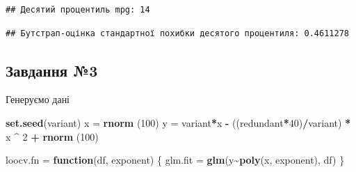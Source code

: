 \documentclass[
]{article}
\newenvironment{Shaded}{\begin{snugshade}}{\end{snugshade}}
\newcommand{\ControlFlowTok}[1]{\textcolor[rgb]{0.13,0.29,0.53}{\textbf{#1}}}
\newcommand{\DecValTok}[1]{\textcolor[rgb]{0.00,0.00,0.81}{#1}}
\newcommand{\FunctionTok}[1]{\textcolor[rgb]{0.13,0.29,0.53}{\textbf{#1}}}
\newcommand{\NormalTok}[1]{#1}
\newcommand{\OtherTok}[1]{\textcolor[rgb]{0.56,0.35,0.01}{#1}}
\newcommand{\SpecialCharTok}[1]{\textcolor[rgb]{0.81,0.36,0.00}{\textbf{#1}}}
\newcommand{\StringTok}[1]{\textcolor[rgb]{0.31,0.60,0.02}{#1}}
\begin{document}
\begin{verbatim}
## Десятий процентиль mpg: 14
\end{verbatim}

\begin{Shaded}
\end{Shaded}

\begin{verbatim}
## Бутстрап-оцінка стандартної похибки десятого процентиля: 0.4611278
\end{verbatim}

\subsection{Завдання
№3}\label{ux437ux430ux432ux434ux430ux43dux43dux44f-3}

Генеруємо дані

\begin{Shaded}
\begin{Highlighting}[]
\FunctionTok{set.seed}\NormalTok{(variant)}
\NormalTok{x }\OtherTok{=} \FunctionTok{rnorm}\NormalTok{ (}\DecValTok{100}\NormalTok{)}
\NormalTok{y }\OtherTok{=}\NormalTok{ variant}\SpecialCharTok{*}\NormalTok{x }\SpecialCharTok{{-}}\NormalTok{ ((redundant}\SpecialCharTok{*}\DecValTok{40}\NormalTok{)}\SpecialCharTok{/}\NormalTok{variant) }\SpecialCharTok{*}\NormalTok{ x }\SpecialCharTok{\^{}} \DecValTok{2} \SpecialCharTok{+} \FunctionTok{rnorm}\NormalTok{ (}\DecValTok{100}\NormalTok{)}
\end{Highlighting}
\end{Shaded}

\begin{Shaded}
\begin{Highlighting}[]
\NormalTok{loocv.fn }\OtherTok{=} \ControlFlowTok{function}\NormalTok{(df, exponent) \{}
\NormalTok{  glm.fit }\OtherTok{=} \FunctionTok{glm}\NormalTok{(y}\SpecialCharTok{\textasciitilde{}}\FunctionTok{poly}\NormalTok{(x, exponent), df)}
\NormalTok{\}}
\end{Highlighting}
\end{Shaded}
\end{document}
